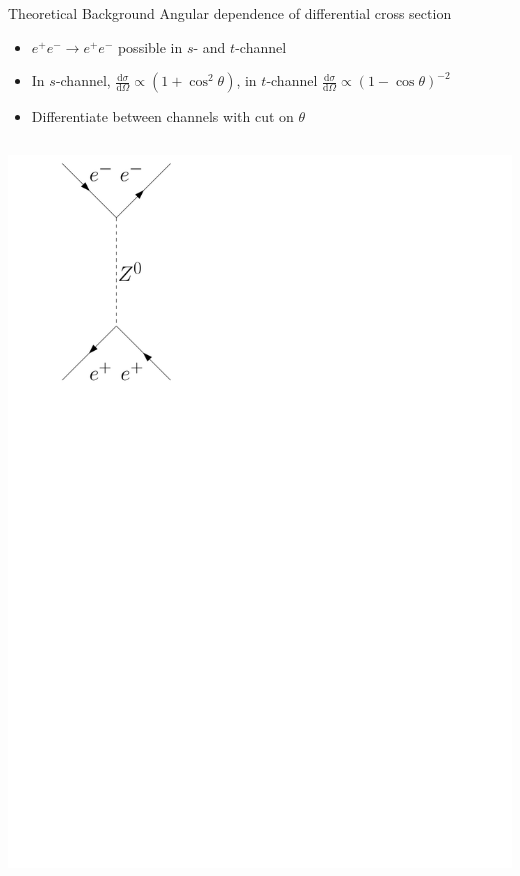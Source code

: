 \documentclass[11pt,xcolor=dvipsnames,professionalfonts]{beamer}
\begin{document}
\begin{frame}{Theoretical Background}
	Angular dependence of differential cross section
	\begin{itemize}
		\item $e^+e^-\rightarrow e^+e^-$ possible in $s$- and $t$-channel
		\item In $s$-channel, $\frac{\mathrm{d}\sigma}{\mathrm{d}\Omega}\propto(1+\cos^2\theta)$, in $t$-channel $\frac{\mathrm{d}\sigma}{\mathrm{d}\Omega}\propto(1-\cos\theta)^{-2}$
		\item Differentiate between channels with cut on $\theta$
	\end{itemize}
	\vspace{.5em}
	\begin{columns}
		\centering
		\includegraphics[width=.8\textwidth]{./figures/theory/feynman/t_z0}
		\centering

\end{columns}
\end{frame}
\end{document}
